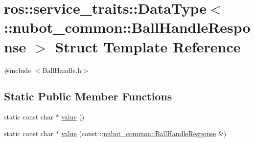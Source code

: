\hypertarget{structros_1_1service__traits_1_1DataType_3_01_1_1nubot__common_1_1BallHandleResponse_01_4}{\section{ros\-:\-:service\-\_\-traits\-:\-:Data\-Type$<$ \-:\-:nubot\-\_\-common\-:\-:Ball\-Handle\-Response $>$ Struct Template Reference}
\label{structros_1_1service__traits_1_1DataType_3_01_1_1nubot__common_1_1BallHandleResponse_01_4}
}


{\ttfamily \#include $<$Ball\-Handle.\-h$>$}

\subsection*{Static Public Member Functions}
\begin{DoxyCompactItemize}
\item 
static const char $\ast$ \hyperlink{structros_1_1service__traits_1_1DataType_3_01_1_1nubot__common_1_1BallHandleResponse_01_4_aebd196780a3e4aced6e67c9dd6baa686}{value} ()
\item 
static const char $\ast$ \hyperlink{structros_1_1service__traits_1_1DataType_3_01_1_1nubot__common_1_1BallHandleResponse_01_4_aeb75f1f77cc78e1ae8d1c5ae90af2e93}{value} (const \-::\hyperlink{namespacenubot__common_a8444206679493f649058adca72f0e538}{nubot\-\_\-common\-::\-Ball\-Handle\-Response} \&)
\end{DoxyCompactItemize}


